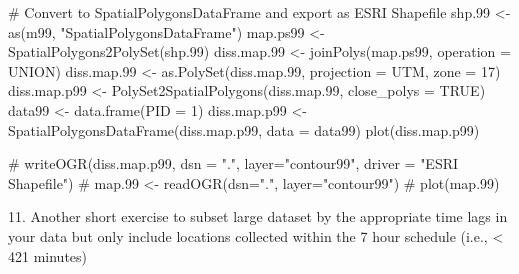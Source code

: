 \documentclass[
  letterpaper,
]{book}
\newenvironment{Shaded}{\begin{snugshade}}{\end{snugshade}}
\newcommand{\AttributeTok}[1]{\textcolor[rgb]{0.40,0.45,0.13}{#1}}
\newcommand{\CommentTok}[1]{\textcolor[rgb]{0.37,0.37,0.37}{#1}}
\newcommand{\ConstantTok}[1]{\textcolor[rgb]{0.56,0.35,0.01}{#1}}
\newcommand{\DecValTok}[1]{\textcolor[rgb]{0.68,0.00,0.00}{#1}}
\newcommand{\FloatTok}[1]{\textcolor[rgb]{0.68,0.00,0.00}{#1}}
\newcommand{\FunctionTok}[1]{\textcolor[rgb]{0.28,0.35,0.67}{#1}}
\newcommand{\NormalTok}[1]{\textcolor[rgb]{0.00,0.23,0.31}{#1}}
\newcommand{\OtherTok}[1]{\textcolor[rgb]{0.00,0.23,0.31}{#1}}
\newcommand{\StringTok}[1]{\textcolor[rgb]{0.13,0.47,0.30}{#1}}
\begin{document}
\begin{Shaded}
\begin{Highlighting}[]
\CommentTok{\# Convert to SpatialPolygonsDataFrame and export as ESRI Shapefile}
\NormalTok{shp}\FloatTok{.99} \OtherTok{\textless{}{-}} \FunctionTok{as}\NormalTok{(m99, }\StringTok{"SpatialPolygonsDataFrame"}\NormalTok{)}
\NormalTok{map.ps99 }\OtherTok{\textless{}{-}} \FunctionTok{SpatialPolygons2PolySet}\NormalTok{(shp}\FloatTok{.99}\NormalTok{)}
\NormalTok{diss.map}\FloatTok{.99} \OtherTok{\textless{}{-}} \FunctionTok{joinPolys}\NormalTok{(map.ps99, }\AttributeTok{operation =} \StringTok{\textquotesingle{}UNION\textquotesingle{}}\NormalTok{)}
\NormalTok{diss.map}\FloatTok{.99} \OtherTok{\textless{}{-}} \FunctionTok{as.PolySet}\NormalTok{(diss.map}\FloatTok{.99}\NormalTok{, }\AttributeTok{projection =} \StringTok{\textquotesingle{}UTM\textquotesingle{}}\NormalTok{, }\AttributeTok{zone =} \StringTok{\textquotesingle{}17\textquotesingle{}}\NormalTok{)}
\NormalTok{diss.map.p99 }\OtherTok{\textless{}{-}} \FunctionTok{PolySet2SpatialPolygons}\NormalTok{(diss.map}\FloatTok{.99}\NormalTok{, }\AttributeTok{close\_polys =} \ConstantTok{TRUE}\NormalTok{)}
\NormalTok{data99 }\OtherTok{\textless{}{-}} \FunctionTok{data.frame}\NormalTok{(}\AttributeTok{PID =} \DecValTok{1}\NormalTok{)}
\NormalTok{diss.map.p99 }\OtherTok{\textless{}{-}} \FunctionTok{SpatialPolygonsDataFrame}\NormalTok{(diss.map.p99, }\AttributeTok{data =}\NormalTok{ data99)}
\FunctionTok{plot}\NormalTok{(diss.map.p99)}

\CommentTok{\# writeOGR(diss.map.p99, dsn = ".", layer="contour99", driver = "ESRI Shapefile")}
\CommentTok{\# map.99 \textless{}{-} readOGR(dsn=".", layer="contour99")}
\CommentTok{\# plot(map.99)}
\end{Highlighting}
\end{Shaded}

11. Another short exercise to subset large dataset by the appropriate
time lags in your data but only include locations collected within the 7
hour schedule (i.e., \textless{} 421 minutes)
\end{document}
